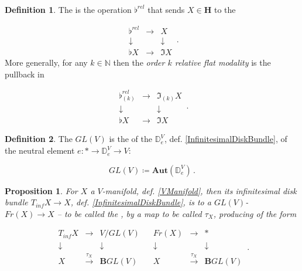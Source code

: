 \documentclass[12pt,titlepage]{article}
\newcommand{\itexarray}[1]{\begin{matrix}#1\end{matrix}}
\theoremstyle{plain}
\newtheorem{prop}{Proposition}
\theoremstyle{definition}
\newtheorem{defn}{Definition}
\theoremstyle{remark}
\begin{document}
\begin{defn}
\label{RelativeFlat}\hypertarget{RelativeFlat}{}
The \emph{} is the operation $\flat^{rel}$ that sends $X \in \mathbf{H}$ to the 

\begin{displaymath}
\itexarray{
    \flat^{rel} &\longrightarrow& X
    \\
    \downarrow && \downarrow
    \\
    \flat X &\longrightarrow& \Im X
  }
  \,.
\end{displaymath}
More generally, for any $k \in \mathbb{N}$ then the \emph{order $k$ relative flat modality} is the pullback in

\begin{displaymath}
\itexarray{
    \flat^{rel}_{(k)} &\longrightarrow& \Im_{(k)} X
    \\
    \downarrow && \downarrow
    \\
    \flat X &\longrightarrow& \Im X
  }
  \,.
\end{displaymath}
\end{defn}
\begin{defn}
\label{GeneralLinearGroup}\hypertarget{GeneralLinearGroup}{}
The \emph{} $GL(V)$ is the  of the  $\mathbb{D}^V_e$, def. \ref{InfinitesimalDiskBundle}, of the neutral element $e \colon \ast \to \mathbb{D}^V_e \to V$:

\begin{displaymath}
GL(V) \coloneqq \mathbf{Aut}(\mathbb{D}^V_e)
  \,.
\end{displaymath}
\end{defn}
\begin{prop}
\label{FrameBundle}\hypertarget{FrameBundle}{}
For $X$ a $V$-manifold, def. \ref{VManifold}, then its infinitesimal disk bundle $T_{inf} X \to X$, def. \ref{InfinitesimalDiskBundle}, is  to a $GL(V)$- $Fr(X) \to X$ -- to be called the \emph{},  by a map to be called $\tau_X$, producing  of the form

\begin{displaymath}
\itexarray{
     T_{inf} X &\longrightarrow& V/GL(V)
     \\
     \downarrow && \downarrow
     \\
     X &\stackrel{\tau_X}{\longrightarrow}& \mathbf{B} GL(V)
  }
  \;\;\;
  \itexarray{
     Fr(X) &\longrightarrow& \ast
     \\
     \downarrow && \downarrow
     \\
     X &\stackrel{\tau_X}{\longrightarrow}& \mathbf{B} GL(V)
  }
  \,.
\end{displaymath}
\end{prop}
\end{document}
